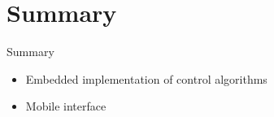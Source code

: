 \documentclass{beamer}
\begin{document}

\section*{Summary}
\begin{frame}{Summary} %
  \begin{itemize}
    \item Embedded implementation of control algorithms
    \item Mobile interface
  \end{itemize}
  
\end{frame}
  
\end{document}
